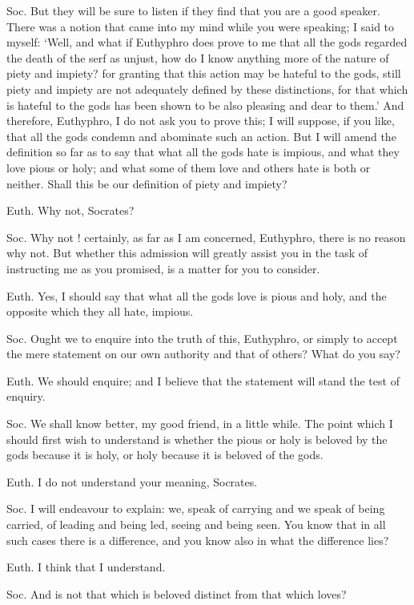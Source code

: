 Soc. But they will be sure to listen if they find that you are a good speaker. There was a notion that came into my mind while you were speaking; I said to myself: `Well, and what if Euthyphro does prove to me that all the gods regarded the death of the serf as unjust, how do I know anything more of the nature of piety and impiety? for granting that this action may be hateful to the gods, still piety and impiety are not adequately defined by these distinctions, for that which is hateful to the gods has been shown to be also pleasing and dear to them.' And therefore, Euthyphro, I do not ask you to prove this; I will suppose, if you like, that all the gods condemn and abominate such an action. But I will amend the definition so far as to say that what all the gods hate is impious, and what they love pious or holy; and what some of them love and others hate is both or neither. Shall this be our definition of piety and impiety?

Euth. Why not, Socrates?

Soc. Why not ! certainly, as far as I am concerned, Euthyphro, there is no reason why not. But whether this admission will greatly assist you in the task of instructing me as you promised, is a matter for you to consider.

Euth. Yes, I should say that what all the gods love is pious and holy, and the opposite which they all hate, impious.

Soc. Ought we to enquire into the truth of this, Euthyphro, or simply to accept the mere statement on our own authority and that of others? What do you say?

Euth. We should enquire; and I believe that the statement will stand the test of enquiry.

Soc. We shall know better, my good friend, in a little while. The point which I should first wish to understand is whether the pious or holy is beloved by the gods because it is holy, or holy because it is beloved of the gods.

Euth. I do not understand your meaning, Socrates.

Soc. I will endeavour to explain: we, speak of carrying and we speak of being carried, of leading and being led, seeing and being seen. You know that in all such cases there is a difference, and you know also in what the difference lies?

Euth. I think that I understand.

Soc. And is not that which is beloved distinct from that which loves?

